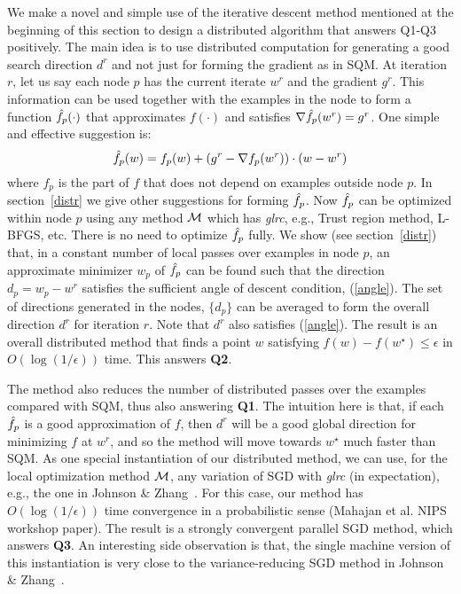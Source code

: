 We make a novel and simple use of the iterative descent method mentioned at the beginning of this section to design a distributed algorithm that answers Q1-Q3 positively. The main idea is to use distributed computation for generating a good search direction $d^r$ and not just for forming the gradient as in SQM. At iteration $r$, let us say each node $p$ has the current iterate $w^r$ and the gradient $g^r$. This information can be used together with the examples in the node to form a function $\hat{f}_p(\cdot)$ that approximates $f(\cdot)$ and satisfies $\nabla\hat{f}_p(w^r)=g^r$. One simple and effective suggestion is:
\begin{equation}
\hat{f}_p(w)=f_p(w)+(g^r - \nabla f_p(w^r))\cdot(w-w^r)
\label{sugg1}
\end{equation}
where $f_p$ is the part of $f$ that does not depend on examples outside node $p$. In section~\ref{distr} we give other suggestions for forming $\hat{f}_p$. Now $\hat{f}_p$ can be optimized within node $p$ using any method ${\cal M}$ which has {\it glrc}, e.g., Trust region method, L-BFGS, etc. There is no need to optimize $\hat{f}_p$ fully. We show (see section~\ref{distr}) that, in a constant number of local passes over examples in node $p$, an approximate minimizer $w_p$ of $\hat{f}_p$ can be found such that the direction $d_p=w_p-w^r$ satisfies the sufficient angle of descent condition, (\ref{angle}). The set of directions generated in the nodes, $\{d_p\}$ can be averaged to form the overall direction $d^r$ for iteration $r$. Note that $d^r$ also satisfies (\ref{angle}). The result is an overall distributed method that finds a point $w$ satisfying $f(w)-f(w^\star)\le\epsilon$ in $O(\log (1/\epsilon))$ time. This answers {\bf Q2}.

The method also reduces the number of distributed passes over the examples compared with SQM, thus also answering {\bf Q1}. The intuition here is that, if each $\hat{f}_p$ is a good approximation of $f$, then $d^r$ will be a good global direction for minimizing $f$ at $w^r$, and so the method will move towards $w^\star$ much faster than SQM.
As one special instantiation of our distributed method, we can use, for the local optimization method ${\cal M}$, any variation of SGD with {\it glrc} (in expectation), e.g., the one in Johnson \& Zhang~. For this case, our method has $O(\log (1/\epsilon))$ time convergence in a probabilistic sense (Mahajan et al. NIPS workshop paper). The result is a strongly convergent parallel SGD method, which answers {\bf Q3}. An interesting side observation is that, the single machine version of this instantiation is very close to the variance-reducing SGD method in Johnson \& Zhang~.


